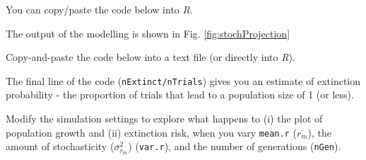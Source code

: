 \documentclass[
  a4paper]{book}
\begin{document}
You can copy/paste the code below into \emph{R}.

The output of the modelling is shown in Fig. \ref{fig:stochProjection}

\begin{do-something}
Copy-and-paste the code below into a text file (or directly into
\emph{R}).

The final line of the code (\texttt{nExtinct/nTrials}) gives you an
estimate of extinction probability - the proportion of trials that lead
to a population size of 1 (or less).

Modify the simulation settings to explore what happens to (i) the plot
of population growth and (ii) extinction risk, when you vary
\texttt{mean.r} (\(\bar{r_m}\)), the amount of stochasticity
(\(\sigma_{r_m}^2\)) (\texttt{var.r}), and the number of generations
(\texttt{nGen}).
\end{do-something}
\end{document}
